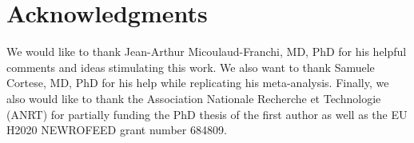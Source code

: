
\section*{Acknowledgments}

We would like to thank Jean-Arthur Micoulaud-Franchi, MD, PhD for his helpful 
comments and ideas stimulating this work. We also want to thank Samuele Cortese, MD, PhD
for his help while replicating his meta-analysis. Finally, we also would like to thank the Association Nationale 
Recherche et Technologie (ANRT) for partially funding the PhD thesis of the first author as well as the EU 
H2020 NEWROFEED grant number 684809.

